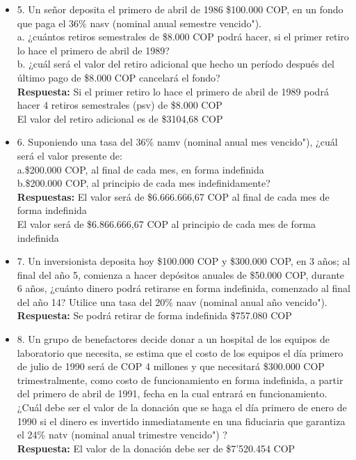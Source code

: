 \begin{itemize}
 \item 5. Un señor deposita el primero de abril de 1986 \$100.000 COP, en un fondo que paga el 36\% nasv (nominal anual semestre vencido").\\

       a. ¿cuántos retiros semestrales de \$8.000 COP podrá hacer, si el primer retiro lo hace el primero de abril de 1989?\\
       b. ¿cuál será el valor del retiro adicional que hecho un período después del último pago de \$8.000 COP cancelará el fondo?\\
       \textbf{Respuesta:} Si el primer retiro lo hace el primero de abril de 1989 podrá hacer 4 retiros semestrales (psv) de \$8.000 COP\\
       El valor del retiro adicional es de \$3104,68 COP\\
       \medskip

 \item 6. Suponiendo una tasa del 36\% namv (nominal anual mes vencido"), ¿cuál será el valor presente de:\\

       a.\$200.000 COP, al final de cada mes, en forma indefinida\\
       b.\$200.000 COP, al principio de cada mes indefinidamente?\\
       \textbf{Respuestas:} El valor será de \$6.666.666,67 COP al final de cada mes de forma indefinida\\
       El valor será de \$6.866.666,67 COP al principio de cada mes de forma indefinida\\
       \medskip

 \item 7. Un inversionista deposita hoy \$100.000 COP y \$300.000 COP, en 3 años; al final del año 5, comienza a hacer depósitos anuales de \$50.000 COP, durante 6 años, ¿cuánto dinero podrá retirarse en forma indefinida, comenzado al final del año 14? Utilice una tasa del 20\% naav (nominal anual año vencido").\\
       \textbf{Respuesta:} Se podrá retirar de forma indefinida \$757.080 COP\\
       \medskip

 \item 8. Un grupo de benefactores decide donar a un hospital de los equipos de laboratorio que necesita, se estima que el costo de los equipos el día primero de julio de 1990 será de COP 4 millones y que necesitará \$300.000 COP trimestralmente, como costo de funcionamiento en forma indefinida, a partir del primero de abril de 1991, fecha en la cual entrará en funcionamiento. ¿Cuál debe ser el valor de la donación que se haga el día primero de enero de 1990 si el dinero es invertido inmediatamente en una fiduciaria que garantiza el 24\%  natv (nominal anual trimestre vencido") ?\\
       \textbf{Respuesta:} El valor de la donación debe ser de \$7’520.454 COP\\
       \medskip


\end{itemize}
